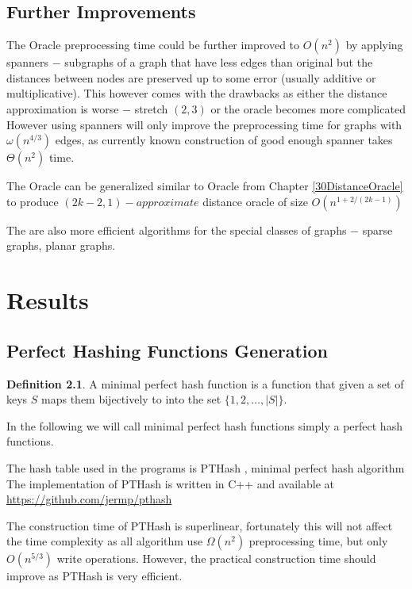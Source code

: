 \documentclass[shortabstract, lic, english]{iithesis}
\theoremstyle{definition} \newtheorem{definition}{Definition}[chapter]
\theoremstyle{remark} \newtheorem{remark}[definition]{Observation}
\theoremstyle{plain} \newtheorem{theorem}[definition]{Theorem}
\theoremstyle{plain} \newtheorem{lemma}[definition]{Lemma}
\theoremstyle{plain} \newtheorem{conjecture}[definition]{Conjecture}
\begin{document}
\section{Further Improvements}

The Oracle preprocessing time could be further improved to $O(n^2)$ by applying spanners $-$ subgraphs of a graph that have less edges than original
but the distances between nodes are preserved up to some error (usually additive or multiplicative).
This however comes with the drawbacks as either the distance approximation is worse $-$ stretch $(2,3)$ \cite{21OracleBasic} or the oracle becomes more complicated \cite{21OracleSpannerNoPenalty} \cite{21OracleSpannerNoPenaltyNoLog}
However using spanners will only improve the preprocessing time for graphs with $\omega(n^{4/3})$ edges, as currently known construction of good enough spanner takes $\Theta(n^2)$ time.

The Oracle can be generalized similar to Oracle from Chapter \ref{30DistanceOracle} to produce $(2k - 2, 1)-approximate$ distance oracle of size $O(n^{1 + 2/(2k-1)})$ \cite{a1Oracle}

The are also more efficient algorithms for the special classes of graphs $-$ sparse graphs, planar graphs.


\chapter{Results} \label{21PracticalComparison}

\section{Perfect Hashing Functions Generation}

\begin{definition}
    A minimal perfect hash function is a function that given a set of keys $S$ maps them bijectively to into the set $\{1,2,\ldots,|S|\}$.
\end{definition}

In the following we will call minimal perfect hash functions simply a perfect hash functions.

The hash table used in the programs is PTHash \cite{hashTablePractical}, minimal perfect hash algorithm
The implementation of PTHash is written in C++ and available at
\newline 
\url{https://github.com/jermp/pthash}

The construction time of PTHash is superlinear, fortunately this will not affect the time complexity as all algorithm use $\Omega(n^2)$ preprocessing time,
but only $O(n^{5/3})$ write operations. However, the practical construction time should improve as PTHash is very efficient.
\end{document}

